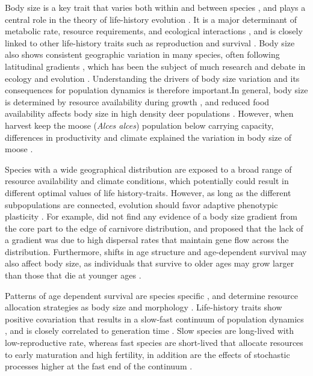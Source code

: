 \documentclass[12pt,a4paper,final,abstract=true,headings=small]{scrartcl}
\begin{document}
Body size is a key trait that varies both within and between species \citep{blanckenhornEvolutionBodySize2000}, and plays a central role in the theory of life-history evolution \citep{stearnsLifeHistoryEvolution2000,clausetEvolutionDistributionSpecies2008}. It is a major determinant of metabolic rate, resource requirements, and ecological interactions \citep{brownMetabolicTheoryEcology2004}, and is closely linked to other life-history traits such as reproduction and survival \citep{roffPredictingBodySize1986,siblyEffectsBodySize2007,brooksHowWellCan2016}. Body size also shows consistent geographic variation in many species, often following latitudinal gradients \citep{blanckenhornEvolutionBodySize2000,hustonRegulationAnimalSize2011}, which has been the subject of much research and debate in ecology and evolution \citep{mcnabEcologicalSignificanceBergmanns1971,blackburnGeographicGradientsBody1999}. Understanding the drivers of body size variation and its consequences for population dynamics is therefore important.In general, body size is determined by resource availability during growth \citep{geistBergmannsRuleInvalid1987}, and reduced food availability affects body size in high density deer populations \citep{albonEarlyDevelopmentPopulation1987,festa-bianchetEarlyDevelopmentAdult2000,gaillardCohortEffectsDeer2003}. However, when harvest keep the moose (\emph{Alces alces}) population below carrying capacity, differences in productivity and climate explained the variation in body size of moose \citep{hjeljordRangebodyMassInteractions1999}.

Species with a wide geographical distribution are exposed to a broad range of resource availability  and climate conditions, which potentially could result in different optimal values of life history-traits. However, as long as the different subpopulations are connected, evolution should favor adaptive phenotypic plasticity \citep{mcnamaraStatedependentLifeHistories1996,kaweckiEvolutionLifeHistories1993}. For example, \citet{meiriLifeEdgeCarnivore2009a} did not find any evidence of a body size gradient from the core part to the edge of carnivore distribution, and proposed that the lack of a gradient was due to high dispersal rates that maintain gene flow across the distribution. Furthermore, shifts in age structure and age-dependent survival may also affect body size, as individuals that survive to older ages may grow larger than those that die at younger ages \citep{theriotAccountingAgeUncovering2024a}.

Patterns of age dependent survival are species specific  \citep{martinPatternsMechanismsAgeDependent1995,loison1999age}, and determine resource allocation strategies as body size and morphology \citep{roffPredictingBodySize1986,siblyEffectsBodySize2007,brooksHowWellCan2016}. Life-history traits show positive covariation that results in a slow-fast continuum of population dynamics \citep{oliFastSlowContinuum2004}, and is closely correlated to generation time \citep{krausLivingSlowDying2005}. Slow species are long-lived with low-reproductive rate, whereas fast species are short-lived that allocate resources to early maturation and high fertility, in addition are the effects of stochastic processes higher at the fast end of the continuum \citep{saetherHowLifeHistory2013}.
\end{document}
